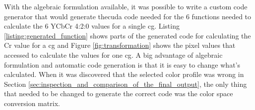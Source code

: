 \begin{table}[H]
    \begin{minipage}[b]{.5\linewidth}
    \end{minipage}
    \caption{Comparison of the number of \gls{fma} operations required to get the desired output.}
    \label{table:debayer_coefficients}
\end{table}

With the algebraic formulation available, it was possible to write a custom code generator that would generate the\gls{cuda} code needed for the 6 functions needed to calculate the 6 YCbCr 4:2:0 values for a single \gls{cg}.
Listing \ref{listing:generated_function} shows parts of the generated code for calculating the Cr value for a \gls{cg} and Figure \ref{fig:transformation} shows the pixel values that accessed to calculate the values for one \gls{cg}.
A big advantage of algebraic formulation and automatic code generation is that it is easy to change what's calculated.
When it was discovered that the selected color profile was wrong in Section \ref{sec:inspection_and_comparison_of_the_final_output}, the only thing that needed to be changed to generate the correct code was the color space conversion matrix.

